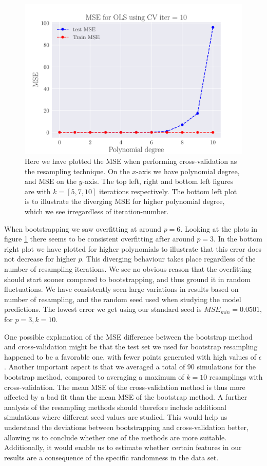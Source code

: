 \documentclass[reprint,english,notitlepage,aps,nobalancelastpage,nofootinbib]{revtex4-1}  %
\begin{document}
\begin{figure}[h]
	\endminipage\hfill
	\includegraphics[width=\linewidth]{MSE_OLS_n30_eps02_pol10_CV_re10.pdf}
	\endminipage
	\caption{Here we have plotted the MSE when performing cross-validation as the resampling technique. On the $x$-axis we have polynomial degree, and MSE on the $y$-axis. The top left, right and bottom left figures are with $k=[5, 7, 10]$ iterations respectively. The bottom left plot is to illustrate the diverging MSE for higher polynomial degree, which we see irregardless of iteration-number.} \label{fig:CV_OLS}
\end{figure}

When bootstrapping we saw overfitting at around $p=6$. Looking at the plots in figure \ref{fig:CV_OLS} there seems to be consistent overfitting after around $p=3$. In the bottom right plot we have plotted for higher polynomials to illustrate that this error does not decrease for higher $p$. This diverging behaviour takes place regardless of the number of resampling iterations. We see no obvious reason that the overfitting should start sooner compared to bootstrapping, and thus ground it in random fluctuations. We have consistently seen large variations in results based on number of resampling, and the random seed used when studying the model predictions. The lowest error we get using our standard seed is $MSE_{min}=0.0501$, for $p=3, k=10$.

One possible explanation of the MSE difference between the bootstrap method and cross-validation might be that the test set we used for bootstrap resampling happened to be a favorable one, with fewer points generated with high values of $\epsilon$. Another important aspect is that we averaged a total of $90$ simulations for the bootstrap method, compared to averaging a maximum of $k=10$ resamplings with cross-validation. The mean MSE of the cross-validation method is thus more affected by a bad fit than the mean MSE of the bootstrap method. A further analysis of the resampling methods should therefore include additional simulations where different seed values are studied. This would help us understand the deviations between bootstrapping and cross-validation better, allowing us to conclude whether one of the methods are more suitable. Additionally, it would enable us to estimate whether certain features in our results are a consequence of the specific randomness in the data set.
\end{document}
